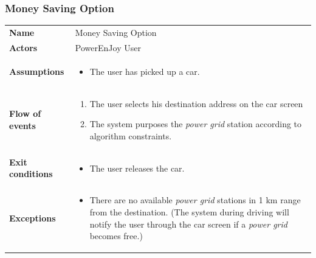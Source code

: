 \documentclass[english]{article}
\newcommand{\powergrid}{\textit{power grid }}
\begin{document}
	\subsubsection{Money Saving Option}
	\begin{center}
	\begin{tabular}{l||p{10cm}}
	\textbf{Name} 
		& Money Saving Option\\ [8px]
	\textbf{Actors} 
		& PowerEnJoy User\\ [8px]
	\textbf{Assumptions} 
	& \begin{itemize}
		\item The user has picked up a car. 
	\end{itemize}\\
	\textbf{Flow of events}
		& \begin{enumerate}
 		\item The user selects his destination address on the car screen
		\item The system purposes the \powergrid station according to algorithm constraints.
		\end{enumerate}\\ 
	\textbf{Exit conditions}
		&\begin{itemize}
			\item The user releases the car.
		\end{itemize}\\
	\textbf{Exceptions}
		& \begin{itemize}
			\item There are no available \powergrid stations in 1 km range from the destination. (The system during driving will notify the user through the car screen if a \powergrid becomes free.)
		\end{itemize}
	\end{tabular}
	\end{center}
\end{document}

